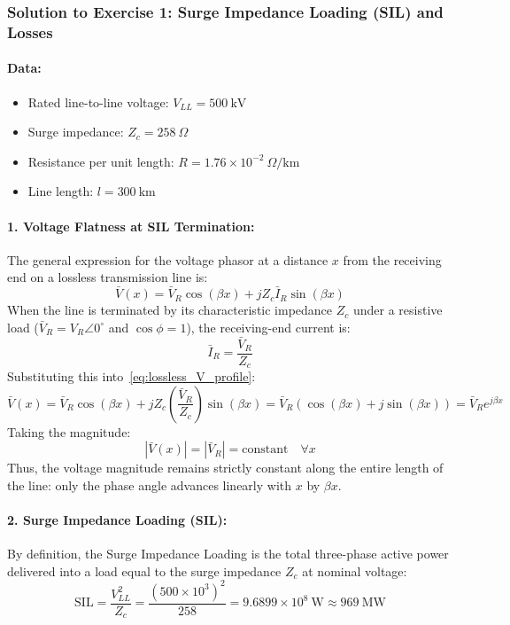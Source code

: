 \subsubsection*{Solution to Exercise 1: Surge Impedance Loading (SIL) and Losses}
\paragraph{Data:}
\begin{itemize}
    \item Rated line-to-line voltage: $V_{LL} = 500\ \text{kV}$
    \item Surge impedance: $Z_c = 258\ \Omega$
    \item Resistance per unit length: $R = 1.76 \times 10^{-2}\ \Omega/\text{km}$
    \item Line length: $l = 300\ \text{km}$
\end{itemize}

\paragraph{1. Voltage Flatness at SIL Termination:}
The general expression for the voltage phasor at a distance $x$ from the receiving end on a lossless transmission line is:
\begin{equation}
    \bar{V}(x) = \bar{V}_R \cos(\beta x) + j Z_c \bar{I}_R \sin(\beta x) \label{eq:lossless_V_profile}
\end{equation}
When the line is terminated by its characteristic impedance $Z_c$ under a resistive load ($\bar{V}_R = V_R \angle 0^\circ$ and $\cos\phi = 1$), the receiving-end current is:
\begin{equation}
    \bar{I}_R = \frac{\bar{V}_R}{Z_c}
\end{equation}
Substituting this into~\eqref{eq:lossless_V_profile}:
\begin{equation}
    \bar{V}(x) = \bar{V}_R \cos(\beta x) + j Z_c \left(\frac{\bar{V}_R}{Z_c}\right) \sin(\beta x) = \bar{V}_R \left( \cos(\beta x) + j\sin(\beta x) \right) = \bar{V}_R e^{j \beta x}
\end{equation}
Taking the magnitude:
\begin{equation}
    |\bar{V}(x)| = |\bar{V}_R| = \text{constant} \quad \forall x
\end{equation}
Thus, the voltage magnitude remains strictly constant along the entire length of the line: only the phase angle advances linearly with $x$ by $\beta x$.

\paragraph{2. Surge Impedance Loading (SIL):}
By definition, the Surge Impedance Loading is the total three-phase active power delivered into a load equal to the surge impedance $Z_c$ at nominal voltage:
\begin{equation}
    \boxed{\text{SIL} = \frac{V_{LL}^2}{Z_c} = \frac{(500 \times 10^3)^2}{258} = 9.6899 \times 10^8\ \text{W} \approx 969\ \text{MW}}
\end{equation}

